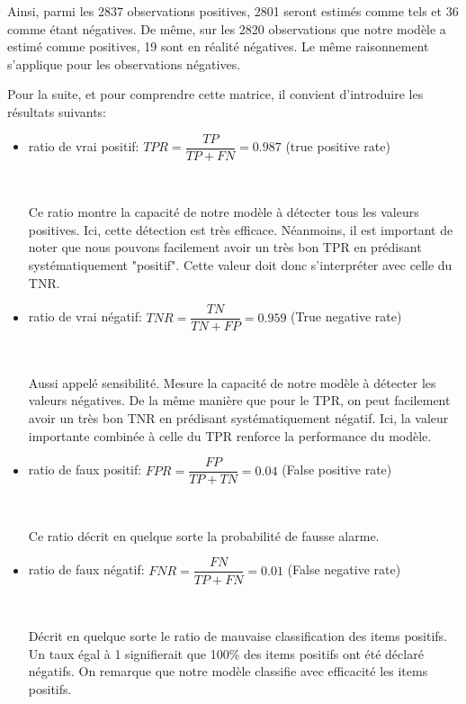 \documentclass[a4paper]{report}
\begin{document}
Ainsi, parmi les 2837 observations positives, 2801 seront estimés comme tels et 36 comme étant négatives. De même, sur les 2820 observations que notre modèle a estimé comme positives, 19 sont en réalité négatives. Le même raisonnement s’applique pour les observations négatives. 


Pour la suite, et pour comprendre cette matrice, il convient d'introduire les résultats suivants:

\begin{itemize}\setlength{\itemsep}{1.5mm}
\item ratio de vrai positif: $TPR=\dfrac{TP}{TP+FN}=0.987$  (true positive rate)

~\par

Ce ratio montre la capacité de notre modèle à détecter tous les valeurs positives. Ici, cette détection est très efficace. Néanmoins, il est important de noter que nous pouvons facilement avoir un très bon TPR en prédisant systématiquement "positif". Cette valeur doit donc s'interpréter avec celle du TNR. 

\item ratio de vrai négatif: $TNR=\dfrac{TN}{TN+FP} = 0.959$ (True negative rate)

~\par

Aussi appelé sensibilité. Mesure la capacité de notre modèle à détecter les valeurs négatives. De la même manière que pour le TPR, on peut facilement avoir un très bon TNR en prédisant systématiquement négatif. Ici, la valeur importante combinée à celle du TPR renforce la performance du modèle.

\item ratio de faux positif: $FPR=\dfrac{FP}{TP+TN}=0.04$ (False positive rate)

~\par

Ce ratio décrit en quelque sorte la probabilité de fausse alarme. 

\item ratio de faux négatif: $FNR=\dfrac{FN}{TP+FN}=0.01 $ (False negative rate)

~\par

Décrit en quelque sorte le ratio de mauvaise classification des items positifs. Un taux égal à 1 signifierait que 100\% des items positifs ont été déclaré négatifs. On remarque que notre modèle classifie avec efficacité les items positifs.


\end{itemize}
\end{document}
